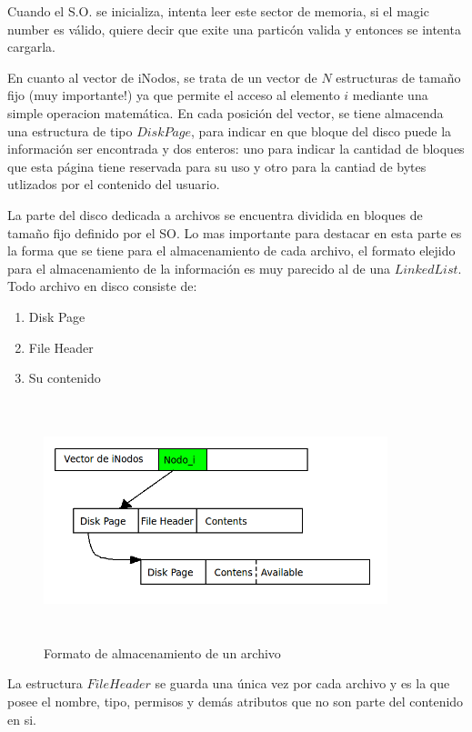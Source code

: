 \documentclass[english]{article}
\begin{document}
Cuando el S.O. se inicializa, intenta leer este sector de memoria, si
el magic number es válido, quiere decir que exite una particón valida
y entonces se intenta cargarla.

En cuanto al vector de iNodos, se trata de un vector de $N$ estructuras
de tamaño fijo (muy importante!) ya que permite el acceso al elemento
$i$ mediante una simple operacion matemática. En cada posición del vector, 
se tiene almacenda una estructura de tipo $DiskPage$, para indicar en que 
bloque del disco puede la información ser encontrada y dos enteros: uno para 
indicar la cantidad de bloques que esta página tiene reservada para su uso y 
otro para la cantiad de bytes utlizados por el contenido del usuario.

La parte del disco dedicada a archivos se encuentra dividida en bloques
de tamaño fijo definido por el SO. Lo mas importante para destacar
en esta parte es la forma que se tiene para el almacenamiento de cada
archivo, el formato elejido para el almacenamiento de la información
es muy parecido al de una $LinkedList$. Todo archivo en disco consiste
de:
\begin{enumerate}
\item Disk Page
\item File Header
\item Su contenido
\end{enumerate}

\begin{figure}[H]
\begin{center}
\includegraphics[width=10cm,height=7cm,keepaspectratio]{Archivo}

\caption{Formato de almacenamiento de un archivo}
\end{center}
\end{figure}


La estructura $File$$Header$ se guarda una única vez por cada archivo
y es la que posee el nombre, tipo, permisos y demás atributos que
no son parte del contenido en si.\\
\end{document}
